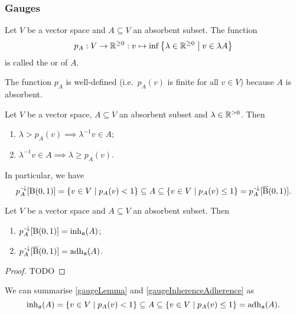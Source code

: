 \subsubsection{Gauges}
\begin{definition}
Let $V$ be a vector space and $A\subseteq V$ an absorbent subset. The function
\[ p_A: V\to \mathbb{R}^{\geq 0}: v\mapsto \inf\left\{ \lambda\in \mathbb{R}^{\geq 0} \;\middle|\; v\in \lambda A \right\} \]
is called the  or  of $A$.
\end{definition}
The function $p_A$ is well-defined (i.e.\ $p_A(v)$ is finite for all $v\in V$) because $A$ is absorbent.

\begin{lemma} \label{gaugeLemma}
Let $V$ be a vector space, $A\subseteq V$ an absorbent subset and $\lambda\in \mathbb{R}^{> 0}$. Then
\begin{enumerate}
\item $\lambda > p_A(v) \implies \lambda^{-1}v\in A$;
\item $\lambda^{-1}v\in A \implies \lambda \geq p_A(v)$.
\end{enumerate}
In particular, we have
\[ p_A^{{\text{\hspace{0.15em}-}\downarrow}}[\operatorname{B}(0,1)] = \left\{ v\in V \;\middle|\; p_A(v) < 1 \right\} \subseteq A \subseteq \left\{ v\in V \;\middle|\; p_A(v) \leq 1 \right\} = p_A^{{\text{\hspace{0.15em}-}\downarrow}}[\operatorname{\overline{B}}(0,1)]. \]
\end{lemma}
\begin{proposition} \label{gaugeInherenceAdherence}
Let $V$ be a vector space and $A\subseteq V$ an absorbent subset. Then
\begin{enumerate}
\item $p_A^{{\text{\hspace{0.15em}-}\downarrow}}[\operatorname{B}(0,1)] = \operatorname{inh}_\mathfrak{a}(A)$;
\item $p_A^{{\text{\hspace{0.15em}-}\downarrow}}[\operatorname{\overline{B}}(0,1)] = \operatorname{adh}_\mathfrak{a}(A)$.
\end{enumerate}
\end{proposition}
\begin{proof}
TODO
\end{proof}
We can summarise \ref{gaugeLemma} and \ref{gaugeInherenceAdherence} as
\[ \operatorname{inh}_\mathfrak{a}(A) = \left\{ v\in V \;\middle|\; p_A(v) < 1 \right\} \subseteq A \subseteq \left\{ v\in V \;\middle|\; p_A(v) \leq 1 \right\} = \operatorname{adh}_\mathfrak{a}(A). \]

